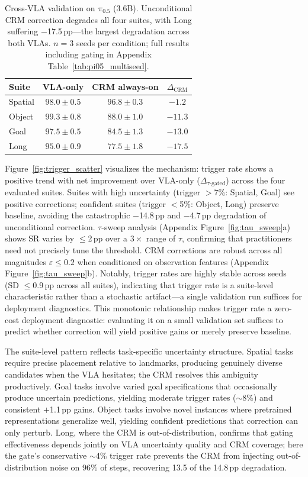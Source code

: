 \begin{table}[t]
\centering
\caption{Cross-VLA validation on $\pi_{0.5}$ (3.6B). Unconditional CRM correction degrades all four suites, with Long suffering $-$17.5\,pp---the largest degradation across both VLAs. $n{=}3$ seeds per condition; full results including gating in Appendix Table~\ref{tab:pi05_multiseed}.}
\label{tab:pi05_main}
\small
\begin{tabular}{lccc}
\toprule
Suite & VLA-only & CRM always-on & $\Delta_{\mathrm{CRM}}$ \\
\midrule
Spatial & $98.0 \pm 0.5$ & $96.8 \pm 0.3$ & $-1.2$ \\
Object & $99.3 \pm 0.8$ & $88.0 \pm 1.0$ & $-11.3$ \\
Goal & $97.5 \pm 0.5$ & $84.5 \pm 1.3$ & $-13.0$ \\
Long & $95.0 \pm 0.9$ & $77.5 \pm 1.8$ & $\mathbf{-17.5}$ \\
\bottomrule
\end{tabular}
\end{table}

Figure~\ref{fig:trigger_scatter} visualizes the mechanism: trigger rate shows a positive trend with net improvement over VLA-only ($\Delta_{\tau\text{-gated}}$) across the four evaluated suites. Suites with high uncertainty (trigger ${>}$7\%: Spatial, Goal) see positive corrections; confident suites (trigger ${<}$5\%: Object, Long) preserve baseline, avoiding the catastrophic $-$14.8\,pp and $-$4.7\,pp degradation of unconditional correction. $\tau$-sweep analysis (Appendix Figure~\ref{fig:tau_sweep}a) shows SR varies by ${\leq}$2\,pp over a $3{\times}$ range of $\tau$, confirming that practitioners need not precisely tune the threshold. CRM corrections are robust across all magnitudes $\varepsilon \leq 0.2$ when conditioned on observation features (Appendix Figure~\ref{fig:tau_sweep}b). Notably, trigger rates are highly stable across seeds (SD ${\leq}$0.9\,pp across all suites), indicating that trigger rate is a suite-level characteristic rather than a stochastic artifact---a single validation run suffices for deployment diagnostics. This monotonic relationship makes trigger rate a zero-cost deployment diagnostic: evaluating it on a small validation set suffices to predict whether correction will yield positive gains or merely preserve baseline.

The suite-level pattern reflects task-specific uncertainty structure. Spatial tasks require precise placement relative to landmarks, producing genuinely diverse candidates when the VLA hesitates; the CRM resolves this ambiguity productively. Goal tasks involve varied goal specifications that occasionally produce uncertain predictions, yielding moderate trigger rates (${\sim}$8\%) and consistent $+$1.1\,pp gains. Object tasks involve novel instances where pretrained representations generalize well, yielding confident predictions that correction can only perturb. Long, where the CRM is out-of-distribution, confirms that gating effectiveness depends jointly on VLA uncertainty quality and CRM coverage; here the gate's conservative ${\sim}$4\% trigger rate prevents the CRM from injecting out-of-distribution noise on 96\% of steps, recovering 13.5 of the 14.8\,pp degradation.


